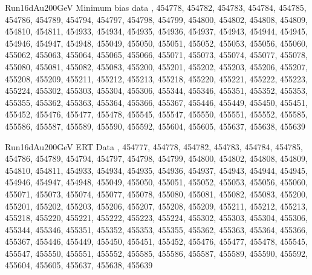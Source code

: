 \documentclass{article}
\begin{document}
Run16dAu200GeV Minimum bias data
, 454778, 454782, 454783, 454784, 454785, 454786, 454789,
454794, 454797, 454798, 454799, 454800, 454802, 454808, 454809,
454810, 454811, 454933, 454934, 454935, 454936, 454937, 454943, 
454944, 454945, 454946, 454947, 454948, 455049, 455050, 455051, 
455052, 455053, 455056, 455060, 455062, 455063, 455064, 455065, 
455066, 455071, 455073, 455074, 455077, 455078, 455080, 455081, 
455082, 455083, 455200, 455201, 455202, 455203, 455206, 455207, 
455208, 455209, 455211, 455212, 455213, 455218, 455220, 455221, 
455222, 455223, 455224, 455302, 455303, 455304, 455306, 455344, 
455346, 455351, 455352, 455353, 455355, 455362, 455363, 455364, 
455366, 455367, 455446, 455449, 455450, 455451, 455452, 455476, 
455477, 455478, 455545, 455547, 455550, 455551, 455552, 455585, 
455586, 455587, 455589, 455590, 455592, 455604, 455605, 455637, 
455638, 455639 

Run16dAu200GeV ERT Data
, 454777, 454778, 454782, 454783, 454784, 454785, 454786,
454789, 454794, 454797, 454798, 454799, 454800, 454802, 454808,
454809, 454810, 454811, 454933, 454934, 454935, 454936, 454937,
454943, 454944, 454945, 454946, 454947, 454948, 455049, 455050,
455051, 455052, 455053, 455056, 455060, 455071, 455073, 455074,
455077, 455078, 455080, 455081, 455082, 455083, 455200, 455201,
455202, 455203, 455206, 455207, 455208, 455209, 455211, 455212,
455213, 455218, 455220, 455221, 455222, 455223, 455224, 455302,
455303, 455304, 455306, 455344, 455346, 455351, 455352, 455353, 
455355, 455362, 455363, 455364, 455366, 455367, 455446, 455449,
455450, 455451, 455452, 455476, 455477, 455478, 455545, 455547,
455550, 455551, 455552, 455585, 455586, 455587, 455589, 455590,
455592, 455604, 455605, 455637, 455638, 455639
\end{document}
